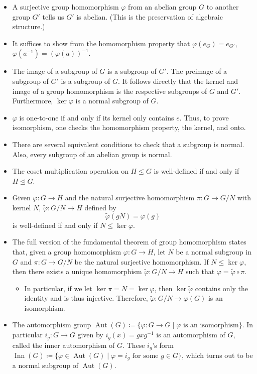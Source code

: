\documentclass{article}
\newcommand{\aut}{\operatorname{Aut}}
\newcommand{\inn}{\operatorname{Inn}}
\renewcommand{\phi}{\varphi}
\begin{document}
\begin{itemize}
    \item A surjective group homomorphism $\phi$ from an abelian group $G$ to another group $G'$ tells us $G'$ is abelian. (This is the preservation of algebraic structure.)
    \item It suffices to show from the homomorphism property that $\phi(e_G) = e_{G'}$, $\phi(a^{-1}) = (\phi(a))^{-1}$.
    \item The image of a subgroup of $G$ is a subgroup of $G'$. The preimage of a subgroup of $G'$ is a subgroup of $G$. It follows directly that the kernel and image of a group homomorphism is the respective subgroups of $G$ and $G'$. Furthermore, $\ker \phi$ is a normal subgroup of $G$.
    \item $\phi$ is one-to-one if and only if its kernel only contains $e$. Thus, to prove isomorphism, one checks the homomorphism property, the kernel, and onto.
    \item There are several equivalent conditions to check that a subgroup is normal. Also, every subgroup of an abelian group is normal.
    \item The coset multiplication operation on $H \leq G$ is well-defined if and only if $H \trianglelefteq G$.
    \item Given $\phi: G \to H$ and the natural surjective homomorphism $\pi: G \to G/N$ with kernel $N$, $\tilde{\phi}: G/N \to H$ defined by $$\tilde{\phi}(gN) = \phi(g)$$ is well-defined if and only if $N \leq \ker \phi$.
    \item The full version of the fundamental theorem of group homomorphism states that, given a group homomorphism $\phi: G \to H$, let $N$ be a normal subgroup in $G$ and $\pi: G \to G/N$ be the natural surjective homomorphism. If $N \leq \ker \phi$, then there exists a unique homomorphism $\tilde{\phi}: G/N \to H$ such that $\phi = \tilde{\phi} \circ \pi$.
    \begin{itemize}
        \item In particular, if we let $\ker \pi = N = \ker \phi $, then $\ker \tilde{\phi}$ contains only the identity and is thus injective. Therefore, $\tilde{\phi}: G/N \to \phi(G)$ is an isomorphism.
    \end{itemize}
    \item The automorphism group $\aut(G) \coloneqq \{\phi: G \to G \mid \phi \text{ is an isomorphism}\}$. In particular $i_g: G \to G$ given by $i_g(x) = g x g^{-1}$ is an automorphism of $G$, called the inner automorphism of $G$. These $i_g$'s form $\inn(G) \coloneqq \{\phi \in \aut(G) \mid \phi = i_g \text{ for some } g \in G\}$, which turns out to be a normal subgroup of $\aut(G)$.

\end{itemize}
\end{document}
